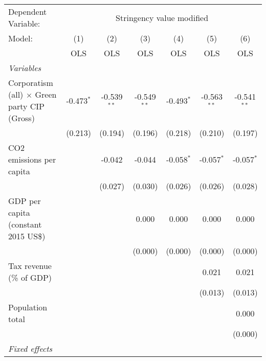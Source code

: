 
\begingroup
\centering
\begin{tabular}{lcccccc}
   \toprule
   Dependent Variable: & \multicolumn{6}{c}{Stringency value modified}\\
   Model:                                              & (1)          & (2)           & (3)           & (4)          & (5)           & (6)\\  
                                                       &  OLS         & OLS           & OLS           & OLS          & OLS           & OLS\\  
   \midrule
   \emph{Variables}\\
   Corporatism (all) $\times$ Green party CIP (Gross)  & -0.473$^{*}$ & -0.539$^{**}$ & -0.549$^{**}$ & -0.493$^{*}$ & -0.563$^{**}$ & -0.541$^{**}$\\   
                                                       & (0.213)      & (0.194)       & (0.196)       & (0.218)      & (0.210)       & (0.197)\\   
   CO2 emissions per capita                            &              & -0.042        & -0.044        & -0.058$^{*}$ & -0.057$^{*}$  & -0.057$^{*}$\\   
                                                       &              & (0.027)       & (0.030)       & (0.026)      & (0.026)       & (0.028)\\   
   GDP per capita (constant 2015 US\$)                 &              &               & 0.000         & 0.000        & 0.000         & 0.000\\   
                                                       &              &               & (0.000)       & (0.000)      & (0.000)       & (0.000)\\   
   Tax revenue (\% of GDP)                             &              &               &               &              & 0.021         & 0.021\\   
                                                       &              &               &               &              & (0.013)       & (0.013)\\   
   Population total                                    &              &               &               &              &               & 0.000\\   
                                                       &              &               &               &              &               & (0.000)\\   
   \emph{Fixed effects}\\

\end{tabular}
